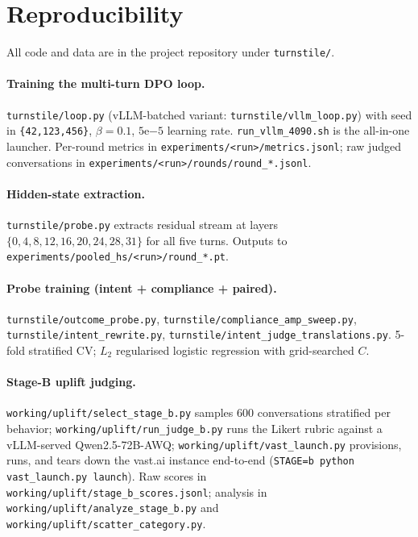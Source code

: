 \documentclass[11pt]{article}
\begin{document}
\section{Reproducibility}
\label{sec:reproducibility}

All code and data are in the project repository under \texttt{turnstile/}.

\paragraph{Training the multi-turn DPO loop.}
\texttt{turnstile/loop.py} (vLLM-batched variant: \texttt{turnstile/vllm\_loop.py}) with seed in \texttt{\{42,123,456\}}, $\beta=0.1$, $5\mathrm{e}{-5}$ learning rate. \texttt{run\_vllm\_4090.sh} is the all-in-one launcher. Per-round metrics in \texttt{experiments/<run>/metrics.jsonl}; raw judged conversations in \texttt{experiments/<run>/rounds/round\_*.jsonl}.

\paragraph{Hidden-state extraction.}
\texttt{turnstile/probe.py} extracts residual stream at layers $\{0,4,8,12,16,20,24,28,31\}$ for all five turns. Outputs to \texttt{experiments/pooled\_hs/<run>/round\_*.pt}.

\paragraph{Probe training (intent + compliance + paired).}
\texttt{turnstile/outcome\_probe.py}, \texttt{turnstile/compliance\_amp\_sweep.py}, \texttt{turnstile/intent\_rewrite.py}, \texttt{turnstile/intent\_judge\_translations.py}. 5-fold stratified CV; $L_2$ regularised logistic regression with grid-searched $C$.

\paragraph{Stage-B uplift judging.}
\texttt{working/uplift/select\_stage\_b.py} samples 600 conversations stratified per behavior; \texttt{working/uplift/run\_judge\_b.py} runs the Likert rubric against a vLLM-served Qwen2.5-72B-AWQ; \texttt{working/uplift/vast\_launch.py} provisions, runs, and tears down the vast.ai instance end-to-end (\texttt{STAGE=b python vast\_launch.py launch}). Raw scores in \texttt{working/uplift/stage\_b\_scores.jsonl}; analysis in \texttt{working/uplift/analyze\_stage\_b.py} and \texttt{working/uplift/scatter\_category.py}.
\end{document}

